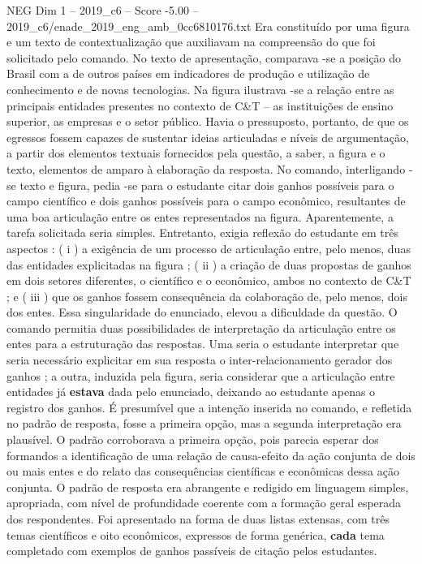\begin{textsample}{NEG Dim 1 – 2019\_c6 – Score -5.00 – 2019\_c6/enade\_2019\_eng\_amb\_0cc6810176.txt}
Era constituído por uma figura e um texto de contextualização que auxiliavam na compreensão do que foi solicitado pelo comando.
No texto de apresentação, comparava -se a posição do Brasil com a de outros países em indicadores de produção e utilização de conhecimento e de novas tecnologias.
Na figura ilustrava -se a relação entre as principais entidades presentes no contexto de C\&T – as instituições de ensino superior, as empresas e o setor público.
Havia o pressuposto, portanto, de que os egressos fossem capazes de sustentar ideias articuladas e níveis de argumentação, a partir dos elementos textuais fornecidos pela questão, a saber, a figura e o texto, elementos de amparo à elaboração da resposta.
No comando, interligando -se texto e figura, pedia -se para o estudante citar dois ganhos possíveis para o campo científico e dois ganhos possíveis para o campo econômico, resultantes de uma boa articulação entre os entes representados na figura.
Aparentemente, a tarefa solicitada seria simples.
Entretanto, exigia reflexão do estudante em três aspectos : ( i ) a exigência de um processo de articulação entre, pelo menos, duas das entidades explicitadas na figura ; ( ii ) a criação de duas propostas de ganhos em dois setores diferentes, o científico e o econômico, ambos no contexto de C\&T ; e ( iii ) que os ganhos fossem consequência da colaboração de, pelo menos, dois dos entes.
Essa singularidade do enunciado, elevou a dificuldade da questão.
O comando permitia duas possibilidades de interpretação da articulação entre os entes para a estruturação das respostas.
Uma seria o estudante interpretar que seria necessário explicitar em sua resposta o inter-relacionamento gerador dos ganhos ; a outra, induzida pela figura, seria considerar que a articulação entre entidades já \textbf{estava} dada pelo enunciado, deixando ao estudante apenas o registro dos ganhos.
É presumível que a intenção inserida no comando, e refletida no padrão de resposta, fosse a primeira opção, mas a segunda interpretação era plausível.
O padrão corroborava a primeira opção, pois parecia esperar dos formandos a identificação de uma relação de causa-efeito da ação conjunta de dois ou mais entes e do relato das consequências científicas e econômicas dessa ação conjunta.
O padrão de resposta era abrangente e redigido em linguagem simples, apropriada, com nível de profundidade coerente com a formação geral esperada dos respondentes.
Foi apresentado na forma de duas listas extensas, com três temas científicos e oito econômicos, expressos de forma genérica, \textbf{cada} tema completado com exemplos de ganhos passíveis de citação pelos estudantes.

\end{textsample}
